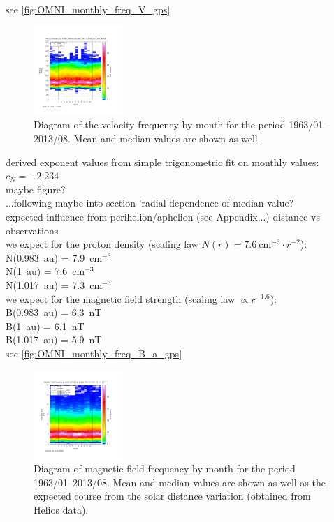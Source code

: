 see \autoref{fig:OMNI_monthly_freq_V_gps}
\begin{figure}[htb]
	\centering
	\includegraphics[width=0.3\textwidth]{images/gnuplots/OMNI_monthly_freq_V_gps.png}
	\caption{Diagram of the velocity frequency by month for the period 1963/01--2013/08. Mean and median values are shown as well.}
	\label{fig:OMNI_monthly_freq_V_gps}
\end{figure}

derived exponent values from simple trigonometric fit on monthly values:\\
$c_N = -2.234$\\
maybe figure?\\

...following maybe into section 'radial dependence of median value?\\
expected influence from perihelion/aphelion (see Appendix...) distance vs observations\\
we expect for the proton density (scaling law $N(r) = 7.6~\text{cm}^{-3} \cdot r^{-2}$):\\
N(0.983~au) = 7.9~cm$^{-3}$\\
N(1~au) = 7.6~cm$^{-3}$\\
N(1.017~au) = 7.3~cm$^{-3}$\\
we expect for the magnetic field strength (scaling law $\propto r^{-1.6}$):\\
B(0.983~au) = 6.3~nT\\
B(1~au) = 6.1~nT\\
B(1.017~au) = 5.9~nT\\

see \autoref{fig:OMNI_monthly_freq_B_a_gps}
\begin{figure}[htb]
	\centering
	\includegraphics[width=0.3\textwidth]{images/gnuplots/OMNI_monthly_freq_B_a_gps.png}
	\caption{Diagram of magnetic field frequency by month for the period 1963/01--2013/08. Mean and median values are shown as well as the expected course from the solar distance variation (obtained from Helios data).}
	\label{fig:OMNI_monthly_freq_B_a_gps}
\end{figure}


